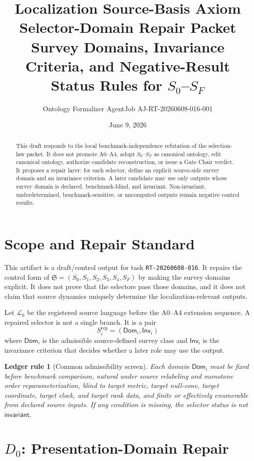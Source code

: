 \documentclass[11pt]{article}
\title{\textbf{Localization Source-Basis Axiom Selector-Domain Repair Packet}\\[0.35em]
\large Survey Domains, Invariance Criteria, and Negative-Result Status Rules for \(S_0\)--\(S_F\)}
\author{Ontology Formalizer AgentJob AJ-RT-20260608-016-001}
\date{June 9, 2026}
\newcommand{\Lang}{\mathcal{L}_{0}}
\newcommand{\Sel}{\mathfrak{S}}
\newcommand{\Dom}{\mathsf{Dom}}
\newcommand{\Inv}{\mathsf{Inv}}
\newtheorem{ledger}{Ledger rule}
\begin{document}
\maketitle

\begin{abstract}
This draft responds to the local benchmark-independence refutation of the
selection-law packet. It does not promote A0--A4, adopt \(S_0\)--\(S_F\) as
canonical ontology, edit canonical ontology, authorize candidate
reconstruction, or issue a Gate Chair verdict. It proposes a repair layer:
for each selector, define an explicit source-side survey domain and an
invariance criterion. A later candidate may use only outputs whose survey
domain is declared, benchmark-blind, and invariant. Non-invariant,
underdetermined, benchmark-sensitive, or uncomputed outputs remain negative
control results.
\end{abstract}

\section{Scope and Repair Standard}

This artifact is a draft/control output for task \texttt{RT-20260608-016}.
It repairs the control form of \(\Sel=(S_0,S_1,S_2,S_3,S_4,S_F)\) by making
the survey domains explicit. It does not prove that the selectors pass those
domains, and it does not claim that source dynamics uniquely determine the
localization-relevant outputs.

Let \(\Lang\) be the registered source language before the A0--A4 extension
sequence. A repaired selector is not a single branch. It is a pair
\[
S_i^{\mathrm{rep}}=(\Dom_i,\Inv_i)
\]
where \(\Dom_i\) is the admissible source-defined survey class and \(\Inv_i\)
is the invariance criterion that decides whether a later role may use the
output.

\begin{ledger}[Common admissibility screen]
Each domain \(\Dom_i\) must be fixed before benchmark comparison, natural
under source relabeling and monotone order reparameterization, blind to
target metric, target null-cone, target coordinate, target clock, and target
rank data, and finite or effectively enumerable from declared source inputs.
If any condition is missing, the selector status is not
\(\mathsf{invariant}\).
\end{ledger}

\section{\texorpdfstring{\(D_0\)}{D0}: Presentation-Domain Repair}
\end{document}
